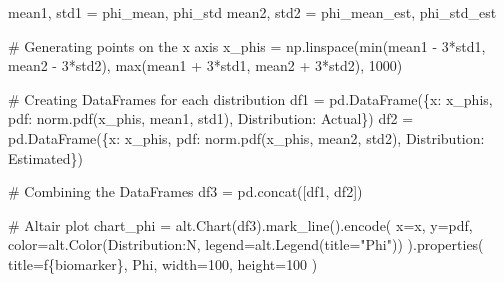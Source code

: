 \documentclass[
  letterpaper,
  DIV=11,
  numbers=noendperiod]{scrreprt}
\newenvironment{Shaded}{\begin{snugshade}}{\end{snugshade}}
\newcommand{\BuiltInTok}[1]{\textcolor[rgb]{0.00,0.23,0.31}{#1}}
\newcommand{\CommentTok}[1]{\textcolor[rgb]{0.37,0.37,0.37}{#1}}
\newcommand{\DecValTok}[1]{\textcolor[rgb]{0.68,0.00,0.00}{#1}}
\newcommand{\NormalTok}[1]{\textcolor[rgb]{0.00,0.23,0.31}{#1}}
\newcommand{\OperatorTok}[1]{\textcolor[rgb]{0.37,0.37,0.37}{#1}}
\newcommand{\SpecialCharTok}[1]{\textcolor[rgb]{0.37,0.37,0.37}{#1}}
\newcommand{\SpecialStringTok}[1]{\textcolor[rgb]{0.13,0.47,0.30}{#1}}
\newcommand{\StringTok}[1]{\textcolor[rgb]{0.13,0.47,0.30}{#1}}
\begin{document}
\begin{Shaded}
\begin{Highlighting}[]
\NormalTok{        mean1, std1 }\OperatorTok{=}\NormalTok{ phi\_mean, phi\_std}
\NormalTok{        mean2, std2 }\OperatorTok{=}\NormalTok{ phi\_mean\_est, phi\_std\_est}

        \CommentTok{\# Generating points on the x axis}
\NormalTok{        x\_phis }\OperatorTok{=}\NormalTok{ np.linspace(}\BuiltInTok{min}\NormalTok{(mean1 }\OperatorTok{{-}} \DecValTok{3}\OperatorTok{*}\NormalTok{std1, mean2 }\OperatorTok{{-}} \DecValTok{3}\OperatorTok{*}\NormalTok{std2), }
                        \BuiltInTok{max}\NormalTok{(mean1 }\OperatorTok{+} \DecValTok{3}\OperatorTok{*}\NormalTok{std1, mean2 }\OperatorTok{+} \DecValTok{3}\OperatorTok{*}\NormalTok{std2), }\DecValTok{1000}\NormalTok{)}

        \CommentTok{\# Creating DataFrames for each distribution}
\NormalTok{        df1 }\OperatorTok{=}\NormalTok{ pd.DataFrame(\{}\StringTok{\textquotesingle{}x\textquotesingle{}}\NormalTok{: x\_phis, }\StringTok{\textquotesingle{}pdf\textquotesingle{}}\NormalTok{: norm.pdf(x\_phis, mean1, std1), }\StringTok{\textquotesingle{}Distribution\textquotesingle{}}\NormalTok{: }\StringTok{\textquotesingle{}Actual\textquotesingle{}}\NormalTok{\})}
\NormalTok{        df2 }\OperatorTok{=}\NormalTok{ pd.DataFrame(\{}\StringTok{\textquotesingle{}x\textquotesingle{}}\NormalTok{: x\_phis, }\StringTok{\textquotesingle{}pdf\textquotesingle{}}\NormalTok{: norm.pdf(x\_phis, mean2, std2), }\StringTok{\textquotesingle{}Distribution\textquotesingle{}}\NormalTok{: }\StringTok{\textquotesingle{}Estimated\textquotesingle{}}\NormalTok{\})}

        \CommentTok{\# Combining the DataFrames}
\NormalTok{        df3 }\OperatorTok{=}\NormalTok{ pd.concat([df1, df2])}

        \CommentTok{\# Altair plot}
\NormalTok{        chart\_phi }\OperatorTok{=}\NormalTok{ alt.Chart(df3).mark\_line().encode(}
\NormalTok{            x}\OperatorTok{=}\StringTok{\textquotesingle{}x\textquotesingle{}}\NormalTok{,}
\NormalTok{            y}\OperatorTok{=}\StringTok{\textquotesingle{}pdf\textquotesingle{}}\NormalTok{,}
\NormalTok{            color}\OperatorTok{=}\NormalTok{alt.Color(}\StringTok{\textquotesingle{}Distribution:N\textquotesingle{}}\NormalTok{, legend}\OperatorTok{=}\NormalTok{alt.Legend(title}\OperatorTok{=}\StringTok{"Phi"}\NormalTok{))}
\NormalTok{        ).properties(}
\NormalTok{            title}\OperatorTok{=}\SpecialStringTok{f\textquotesingle{}}\SpecialCharTok{\{}\NormalTok{biomarker}\SpecialCharTok{\}}\SpecialStringTok{, Phi\textquotesingle{}}\NormalTok{,}
\NormalTok{            width}\OperatorTok{=}\DecValTok{100}\NormalTok{,}
\NormalTok{            height}\OperatorTok{=}\DecValTok{100}
\NormalTok{            )}
        

\end{Highlighting}
\end{Shaded}
\end{document}
